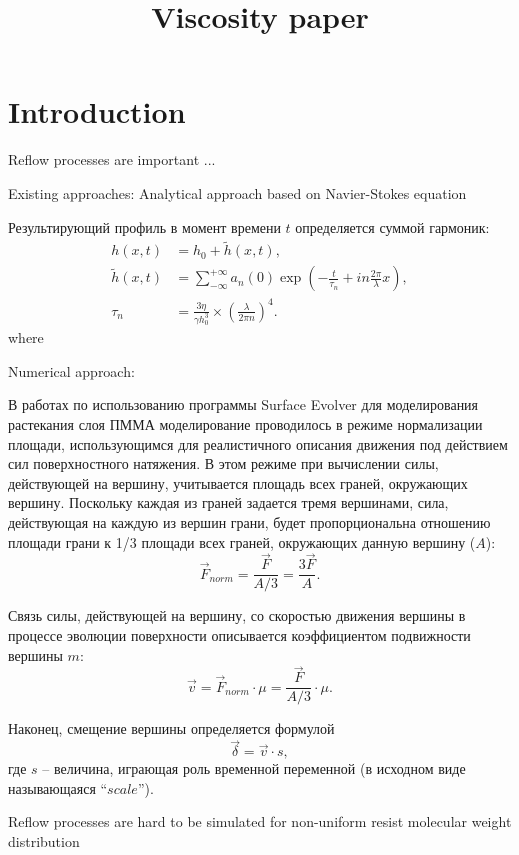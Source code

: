 \documentclass[12pt, letterpaper]{article}
\title{Viscosity paper}
\begin{document}
\section{Introduction}

Reflow processes are important ...

Existing approaches:
Analytical approach based on Navier-Stokes equation

Результирующий профиль в момент времени $t$ определяется суммой гармоник:
\begin{align}
	h(x, t) &= h_0 + \tilde{h}(x, t),\\
	\tilde{h}(x, t) &= \sum_{-\infty}^{+\infty} a_n(0) \exp (-\frac{t}{\tau_n}+i n \frac{2 \pi}{\lambda} x),\\
	\tau_n &= \frac{3 \eta}{\gamma h_0^3} \times(\frac{\lambda}{2 \pi n})^4.
\end{align}
where

Numerical approach:

В работах по использованию программы \textquotedbl Surface Evolver\textquotedbl{} для моделирования растекания слоя ПММА моделирование проводилось в режиме нормализации площади, использующимся для реалистичного описания движения под действием сил поверхностного натяжения. В этом режиме при вычислении силы, действующей на вершину, учитывается площадь всех граней, окружающих вершину. Поскольку каждая из граней задается тремя вершинами,
сила, действующая на каждую из вершин грани, будет пропорциональна отношению площади грани к 1/3 площади всех граней, окружающих данную вершину ($A$):
\begin{equation}
	\vec{F}_{norm} = \frac{\vec{F}}{A/3} = \frac{3\vec{F}}{A}.
\end{equation}

Связь силы, действующей на вершину, со скоростью движения вершины в процессе эволюции поверхности описывается коэффициентом подвижности вершины $m$:
\begin{equation}
	\vec{v} = \vec{F}_{norm} \cdot \mu = \frac{\vec{F}}{A/3} \cdot \mu.
\end{equation}

Наконец, смещение вершины определяется формулой
\begin{equation} \label{eq:SE_delta}
	\vec{\delta} = \vec{v} \cdot s,
\end{equation}
где $s$ -- величина, играющая роль временной переменной (в исходном виде называющаяся ``$scale$'').



Reflow processes are hard to be simulated for non-uniform resist molecular weight distribution
\end{document}
